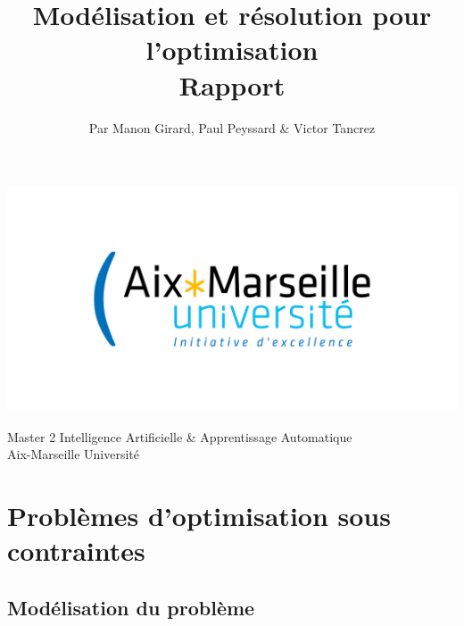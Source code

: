 \documentclass[a4paper, 10pt]{article}
\begin{document}
\setlength{\parindent}{0cm}
\setlength{\parskip}{1ex plus 0.5ex minus 0.2ex}
\newcommand{\hsp}{\hspace{20pt}}
\newcommand{\HRule}{\rule{\linewidth}{0.5mm}}

  \title{Modélisation et résolution pour l'optimisation \\ Rapport \\[1ex] \large }
  \author{Par Manon Girard, Paul Peyssard \& Victor Tancrez}
  \date{}
  \maketitle

  \begin{center}
    \includegraphics[scale=0.2]{images/amu2.png}
  \end{center}

  \vfill
  \begin{center}
    Master 2 Intelligence Artificielle \& Apprentissage Automatique \\
    Aix-Marseille Université \\
  \end{center}
  \pagebreak

  \tableofcontents
  \newpage

  \section{Problèmes d'optimisation sous contraintes}

    \subsection{Modélisation du problème}
\end{document}
